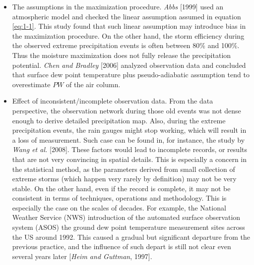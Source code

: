 \begin{itemize}
\item The assumptions in the maximization procedure. \textit{Abbs} [1999] used an atmospheric model and checked the linear assumption assumed in equation \ref{eq:1-1}. This study found that such linear assumption may introduce bias in the maximization procedure. On the other hand, the storm efficiency during the observed extreme precipitation events is often between 80\% and 100\%. Thus the moisture maximization does not fully release the precipitation potential. \textit{Chen and Bradley} [2006] analyzed observation data and concluded that surface dew point temperature plus pseudo-adiabatic assumption tend to overestimate $PW$ of the air column.

\item Effect of inconsistent/incomplete observation data. From the data perspective, the observation network during those old events was not dense enough to derive detailed precipitation map. Also, during the extreme precipitation events, the rain gauges might stop working, which will result in a loss of measurement. Such case can be found in, for instance, the study by \textit{Wang et al.} [2008]. These factors would lead to incomplete records, or results that are not very convincing in spatial details. This is especially a concern in the statistical method, as the parameters derived from small collection of extreme storms (which happen very rarely by definition) may not be very stable. On the other hand, even if the record is complete, it may not be consistent in terms of techniques, operations and methodology. This is especially the case on the scales of decades. For example, the National Weather Service (NWS) introduction of the automated surface observation system (ASOS) the ground dew point temperature measurement sites across the US around 1992. This caused a gradual but significant departure from the previous practice, and the influence of such depart is still not clear even several years later [\textit{Heim and Guttman}, 1997].


\end{itemize}
